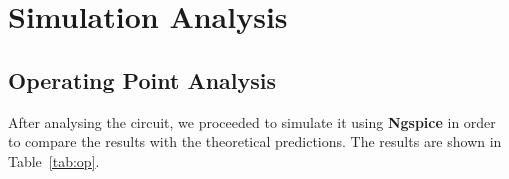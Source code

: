\newpage

\section{Simulation Analysis}
\label{sec:simulation}

\subsection{Operating Point Analysis}
\label{sec:op_point}

After analysing the circuit, we proceeded to simulate it using {\bf Ngspice} in order to compare the results with the theoretical predictions. The results are shown in Table~\ref{tab:op}.
